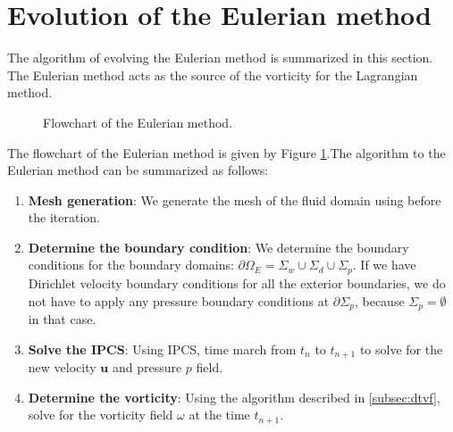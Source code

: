 
\section{Evolution of the Eulerian method}
\label{sec:eu-eotem}
The algorithm of evolving the Eulerian method is summarized in this section. The Eulerian method acts as the source of the vorticity for the Lagrangian method.


	\begin{figure}[!h]
		\centering
		\caption{Flowchart of the Eulerian method.}
		\label{fig:flowchart_eulerian}
	\end{figure}	
	
The flowchart of the Eulerian method is given by Figure \ref{fig:flowchart_eulerian}.The algorithm to the Eulerian method can be summarized as follows:
	\begin{enumerate}
	\item \textbf{Mesh generation}: We generate the mesh of the fluid domain using \gmsh before the iteration.
	\item \textbf{Determine the boundary condition}: We determine the boundary conditions for the boundary domains: $\partial \Omega_E = \Sigma_{w} \cup \Sigma_{d} \cup \Sigma_{p}$. If we have Dirichlet velocity boundary conditions for all the exterior boundaries, we do not have to apply any pressure boundary conditions at $\partial \Sigma_{p}$, because $\Sigma_{p}=\emptyset$ in that case.
	\item \textbf{Solve the IPCS}: Using IPCS, time march from $t_n$ to $t_{n+1}$ to solve for the new velocity $\mathbf{u}$ and pressure $p$ field.
	\item \textbf{Determine the vorticity}: Using the algorithm described in \ref{subsec:dtvf}, solve for the vorticity field $\omega$ at the time $t_{n+1}$. 
	\end{enumerate}
	
